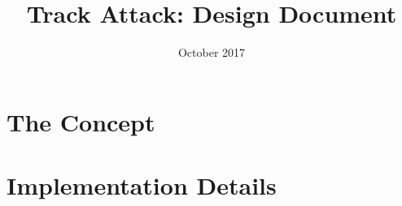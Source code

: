 \documentclass[12pt, a4paper]{article}
\author{}
\title{Track Attack: Design Document}
\date{October 2017}
\begin{document}
\maketitle

\section*{The Concept}
\section*{Implementation Details}
\end{document}

